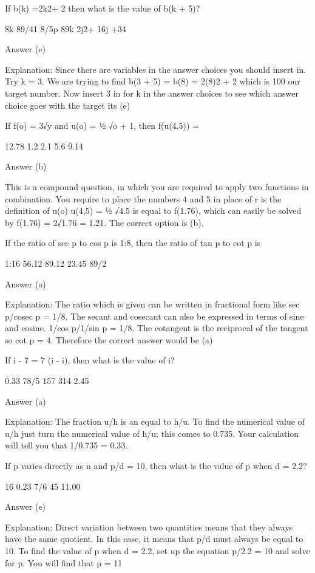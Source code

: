     If b(k) =2k2+ 2 then what is the value of b(k + 5)?

        8k
        89/41
        8/5p
        89k
        2j2+ 16j +34 

    Answer (e)

    Explanation: Since there are variables in the answer choices you should insert in. Try k = 3. We are trying to find b(3 + 5) = b(8) = 2(8)2 + 2 which is 100 our target number. Now insert 3 in for k in the answer choices to see which answer choice goes with the target its (e)

    If f(o) = 3√y and u(o) = ½ √o + 1, then f(u(4.5)) =

        12.78
        1.2
        2.1
        5.6
        9.14 

    Answer (b)

    This is a compound question, in which you are required to apply two functions in combination. You require to place the numbers 4 and 5 in place of r is the definition of u(o) u(4,5) = ½ √4.5 is equal to f(1.76), which can easily be solved by f(1.76) = 2√1.76 = 1.21. The correct option is (b).

    If the ratio of sec p to cos p is 1:8, then the ratio of tan p to cot p is

        1:16
        56.12
        89.12
        23.45
        89/2 

    Answer (a)

    Explanation: The ratio which is given can be written in fractional form like sec p/cosec p = 1/8. The secant and cosecant can also be expressed in terms of sine and cosine. 1/cos p/1/sin p = 1/8. The cotangent is the reciprocal of the tangent so cot p = 4. Therefore the correct answer would be (a)

    If i - 7 = 7 (i - i), then what is the value of i?

        0.33
        78/5
        157
        314
        2.45 

    Answer (a)

    Explanation: The fraction u/h is an equal to h/u. To find the numerical value of u/h just turn the numerical value of h/u; this comes to 0.735. Your calculation will tell you that 1/0.735 = 0.33.

    If p varies directly as n and p/d = 10, then what is the value of p when d = 2.2?

        16
        0.23
        7/6
        45
        11.00 

    Answer (e)

    Explanation: Direct variation between two quantities means that they always have the same quotient. In this case, it means that p/d must always be equal to 10. To find the value of p when d = 2.2, set up the equation p/2.2 = 10 and solve for p. You will find that p = 11

